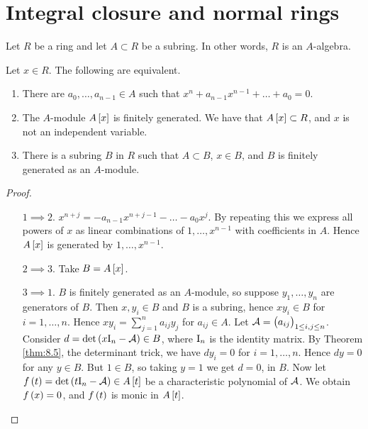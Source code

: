 \pagebreak

\section{Integral closure and normal rings}

Let $ R $ be a ring and let $ A \subset R $ be a subring. In other words, $ R $ is an $ A $-algebra.

\begin{theorem}
\label{thm:14.1}
Let $ x \in R $. The following are equivalent.
\begin{enumerate}
\item There are $ a_0, \dots, a_{n - 1} \in A $ such that $ x^n + a_{n - 1}x^{n - 1} + \dots + a_0 = 0 $.
\item The $ A $-module $ A\sbr{x} $ is finitely generated. We have that $ A\sbr{x} \subset R $, and $ x $ is not an independent variable.
\item There is a subring $ B $ in $ R $ such that $ A \subset B $, $ x \in B $, and $ B $ is finitely generated as an $ A $-module.
\end{enumerate}
\end{theorem}

\begin{proof}
\hfill
\begin{itemize}[leftmargin=0.5in]
\item[$ 1 \implies 2 $.] $ x^{n + j} = -a_{n - 1}x^{n + j - 1} - \dots - a_0x^j $. By repeating this we express all powers of $ x $ as linear combinations of $ 1, \dots, x^{n - 1} $ with coefficients in $ A $. Hence $ A\sbr{x} $ is generated by $ 1, \dots, x^{n - 1} $.
\item[$ 2 \implies 3 $.] Take $ B = A\sbr{x} $.
\item[$ 3 \implies 1 $.] $ B $ is finitely generated as an $ A $-module, so suppose $ y_1, \dots, y_n $ are generators of $ B $. Then $ x, y_i \in B $ and $ B $ is a subring, hence $ xy_i \in B $ for $ i = 1, \dots, n $. Hence $ xy_i = \sum_{j = 1}^n a_{ij}y_j $ for $ a_{ij} \in A $. Let $ \AAA = \br{a_{ij}}_{1 \le i, j \le n} $. Consider $ d = \det \br{x\I_n - \AAA} \in B $, where $ \mathrm{I}_n $ is the identity matrix. By Theorem \ref{thm:8.5}, the determinant trick, we have $ dy_i = 0 $ for $ i = 1, \dots, n $. Hence $ dy = 0 $ for any $ y \in B $. But $ 1 \in B $, so taking $ y = 1 $ we get $ d = 0 $, in $ B $. Now let $ f\br{t} = \det \br{t\I_n - \AAA} \in A\sbr{t} $ be a characteristic polynomial of $ \mathcal{A} $. We obtain $ f\br{x} = 0 $, and $ f\br{t} $ is monic in $ A\sbr{t} $.
\end{itemize}
\end{proof}

